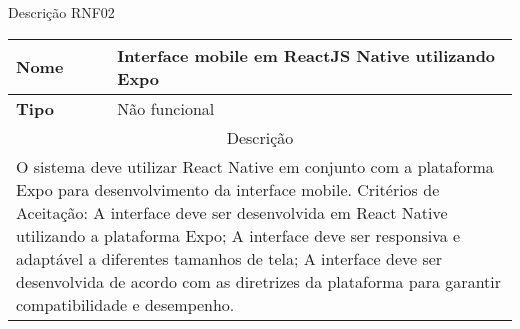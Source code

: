 \begin{quadro}[htb]
	\centering
	\caption{\label{Formatação do texto.}Descrição RNF02}	
	\begin{tabular}{|l|p{11cm}|}
		\hline
		\textbf{Nome}    & Interface mobile em ReactJS Native utilizando Expo\\ \hline
		\textbf{Tipo}    & Não funcional\\ \hline
		\multicolumn{2}{|c|}{Descrição}\\ \hline
		\multicolumn{2}{|p{12cm}|}{
			O sistema deve utilizar React Native em conjunto com a plataforma Expo para desenvolvimento da interface mobile. \newline
			\newline Critérios de Aceitação: \newline
			A interface deve ser desenvolvida em React Native utilizando a plataforma Expo; \newline
			\newline A interface deve ser responsiva e adaptável a diferentes tamanhos de tela;\newline
			\newline A interface deve ser desenvolvida de acordo com as diretrizes da plataforma para garantir compatibilidade e desempenho.
			} \\ \hline
	\end{tabular}
\end{quadro}